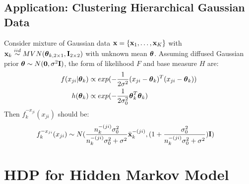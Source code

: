 \documentclass{article} %
\begin{document}
\subsection{Application: Clustering Hierarchical Gaussian Data}
Consider mixture of Gaussian data ${\bf x} = \{ {\bf x}_1, \dots, {\bf x}_K \}$ with ${\bf x}_k \stackrel{iid}{\sim} MVN(\boldsymbol{\theta}_{k, 2 \times 1}, {\bf I}_{2 \times 2})$ with unknown mean $\boldsymbol{\theta}$. Assuming diffused Gaussian prior $\boldsymbol{\theta} \sim N({\bf 0}, \sigma^2 {\bf I})$, the form of likelihood $F$ and base measure $H$ are:
\begin{align*}
f(x_{ji} | \boldsymbol{\theta}_k )
&\propto
exp(-\frac{1}{2 \sigma^2} (x_{ji} - \boldsymbol{\theta}_k)^T(x_{ji} - \boldsymbol{\theta}_k))
\\
h(\boldsymbol{\theta}_k)
&\propto
exp(-\frac{1}{2\sigma_0^2}\boldsymbol{\theta}_k^T\boldsymbol{\theta}_k)
\end{align*}
Then $f_k^{-x_{ji}}(x_{ji})$ should be:
\begin{align*}
f_k^{-x_{ji}}(x_{ji}) & \sim
N( \frac{n_{k}^{-(ji)}\sigma_0^2}{ n_{k}^{-(ji)}\sigma_0^2 + \sigma^2}
\bar{{\bf x}}_k^{-(ji)},
(1 + \frac{\sigma_0^2}{n_{k}^{-(ji)} \sigma_0^2 + \sigma^2} ) {\bf I})
\end{align*}


\newpage
\section{HDP for Hidden Markov Model}
\end{document}
